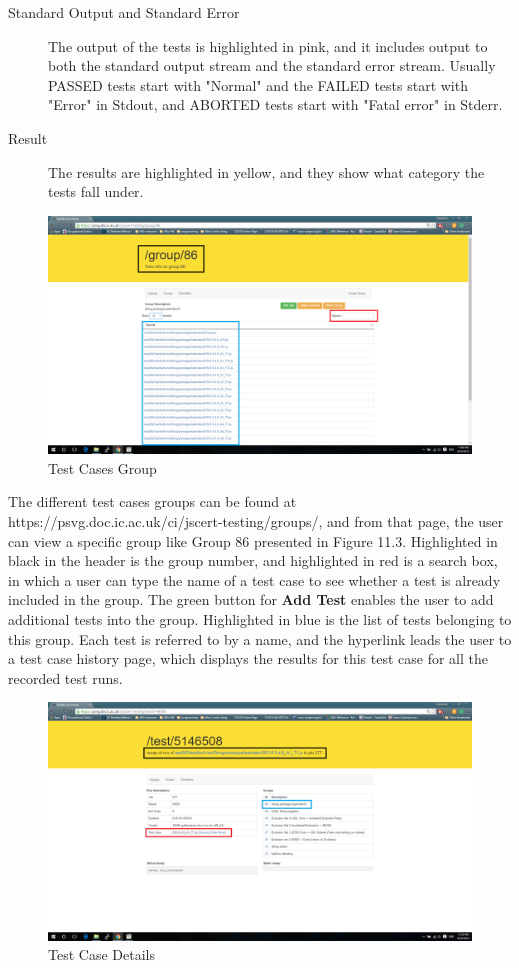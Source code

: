 \documentclass[a4paper,11pt,twoside]{report}
\begin{document}
\begin{description}
\item[Standard Output and Standard Error] The output of the tests is highlighted in pink, and it includes output to both the standard output stream and the standard error stream. Usually PASSED tests start with "Normal" and the FAILED tests start with "Error" in Stdout, and ABORTED tests start with "Fatal error" in Stderr.

\item[Result] The results are highlighted in yellow, and they show what category the tests fall under.
\end{description} 

\begin{figure}[h!]
  \caption{Test Cases Group}
  \includegraphics[width=1.0\textwidth]{group_testing_screen_boxed}
\end{figure}

The different test cases groups can be found at https://psvg.doc.ic.ac.uk/ci/jscert-testing/groups/, and from that page, the user can view a specific group like Group 86 presented in Figure 11.3. Highlighted in black in the header is the group number, and highlighted in red is a search box, in which a user can type the name of a test case to see whether a test is already included in the group. The green button for \textbf{Add Test} enables the user to add additional tests into the group. Highlighted in blue is the list of tests belonging to this group. Each test is referred to by a name, and the hyperlink leads the user to a test case history page, which displays the results for this test case for all the recorded test runs. 

\begin{figure}[h!]
  \caption{Test Case Details}
  \includegraphics[width=1.0\textwidth]{test_case_testing_screen_boxed}
\end{figure}
\end{document}
